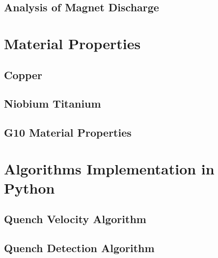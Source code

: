 \documentclass[11pt,a4paper]{report}
\begin{document}
\section{Analysis of Magnet Discharge}
% 

\clearpage
\begin{appendices}
\chapter{Material Properties}
\label{appendix_material_properties_description}


\section{Copper}
\label{appendix:cu_material_properties}


\section{Niobium Titanium}
\label{appendix:nbti_material_properties}


\section{G10 Material Properties}
\label{appendix:g10_material_properties}


\clearpage
\chapter{Algorithms Implementation in Python}

\section{Quench Velocity Algorithm}
\label{appendix:python_quench_velocity_algorithm}
% 

\section{Quench Detection Algorithm}
\label{appendix:python_quench_detection_algorithm}
% 


\end{appendices}
\end{document}
